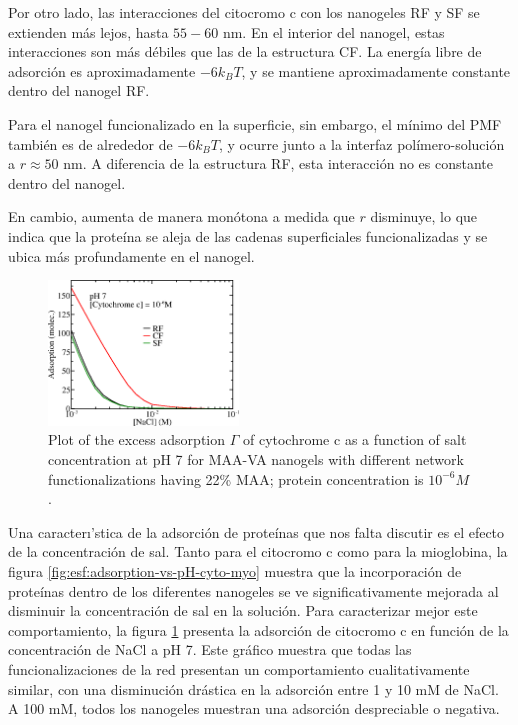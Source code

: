 Por otro lado, las interacciones del citocromo c con los nanogeles RF y SF se extienden m\'as lejos, hasta $55-60$ nm. En el interior del nanogel, estas interacciones son m\'as débiles que las de la estructura CF. La energ\'ia libre de adsorci\'on es aproximadamente $-6 k_BT$, y se mantiene aproximadamente constante dentro del nanogel RF.

Para el nanogel funcionalizado en la superficie, sin embargo, el m\'inimo del PMF tambi\'en es de alrededor de $-6 k_BT$, y ocurre junto a la interfaz pol\'imero-soluci\'on a $r\approx 50$ nm. A diferencia de la estructura RF, esta interacci\'on no es constante dentro del nanogel. 

En cambio, aumenta de manera mon\'otona a medida que $r$ disminuye, lo que indica que la prote\'ina se aleja de las cadenas superficiales funcionalizadas y se ubica m\'as profundamente en el nanogel.




\begin{figure}
     \centering
     \includegraphics[width=0.45\textwidth]{Figures/graphs-gel2/gamma-salts-cyto.png}
     \caption{Plot of the excess adsorption $\Gamma$ of cytochrome c as a function of salt concentration at pH 7 for MAA-VA nanogels with different network functionalizations having 22\% MAA; protein concentration is $10^{-6}M$.}
     \label{fig:esf:adsorption-vs-salt-cyto}
 \end{figure}
 

Una caracter\i'stica de la adsorci\'on de prote\'inas que nos falta discutir es el efecto de la concentraci\'on de sal.
Tanto para el citocromo c como para la mioglobina, la figura \ref{fig:esf:adsorption-vs-pH-cyto-myo} muestra que la incorporaci\'on de prote\'inas dentro de los diferentes nanogeles se ve significativamente mejorada al disminuir la concentraci\'on de sal en la soluci\'on.
Para caracterizar mejor este comportamiento, la figura \ref{fig:esf:adsorption-vs-salt-cyto} presenta la adsorci\'on de citocromo c en funci\'on de la concentraci\'on de NaCl a pH 7.
Este gr\'afico muestra que todas las funcionalizaciones de la red presentan un comportamiento cualitativamente similar, con una disminuci\'on dr\'astica en la adsorci\'on entre 1 y 10 mM de NaCl.
A 100 mM, todos los nanogeles muestran una adsorci\'on despreciable o negativa.

